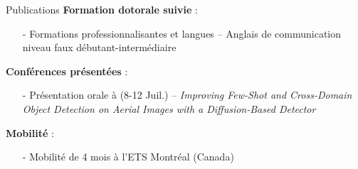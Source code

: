 \begin{subsectionframemod}{Publications}
    \textbf{Formation dotorale suivie} :
    \begin{itemize}
        \item[-] Formations professionnalisantes et langues -- Anglais de communication niveau faux débutant-intermédiaire  
    \end{itemize}

    \textbf{Conférences présentées} :
    \begin{itemize}
        \item[-] Présentation orale à  (8-12 Juil.) -- \textit{Improving Few-Shot and Cross-Domain Object Detection on Aerial Images with a Diffusion-Based Detector} 
    \end{itemize}

    \textbf{Mobilité} :
    \begin{itemize}
        \item[-] Mobilité de 4 mois à l'ETS Montréal (Canada)
    \end{itemize}

\end{subsectionframemod}

